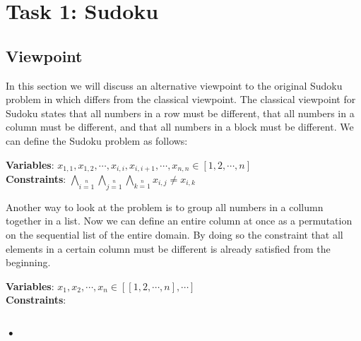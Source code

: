 \section{Task 1: Sudoku}\label{sec:sudoku}
\subsection{Viewpoint}

In this section we will discuss an alternative viewpoint to the original Sudoku problem in which differs from the classical viewpoint. The classical viewpoint for Sudoku states that all numbers in a row must be different, that all numbers in a column must be different, and that all numbers in a block must be different. We can define the Sudoku problem as follows: \\

\begin{center}
\textbf{Variables}: $ x_{1,1},x_{1,2},\cdots,x_{i,i},x_{i,i+1},\cdots,x_{n,n} \in [1,2,\cdots,n]$\\
\textbf{Constraints}: $\bigwedge \limits_{i=1} \limits^{n} \bigwedge \limits_{j=1} \limits^{n} \bigwedge \limits_{k=1} \limits^{n} x_{i,j} \neq x_{i,k}$
\end{center}

Another way to look at the problem is to group all numbers in a collumn together in a list. Now we can define an entire column at once as a permutation on the sequential list of the entire domain.
By doing so the constraint that all elements in a certain column must be different is already satisfied from the beginning.

\begin{center}
\textbf{Variables}: $ x_{1},x_{2},\cdots,x_{n} \in [[1,2,\cdots,n],\cdots]$\\
\textbf{Constraints}: 
\end{center}

\subsubsection{•}
